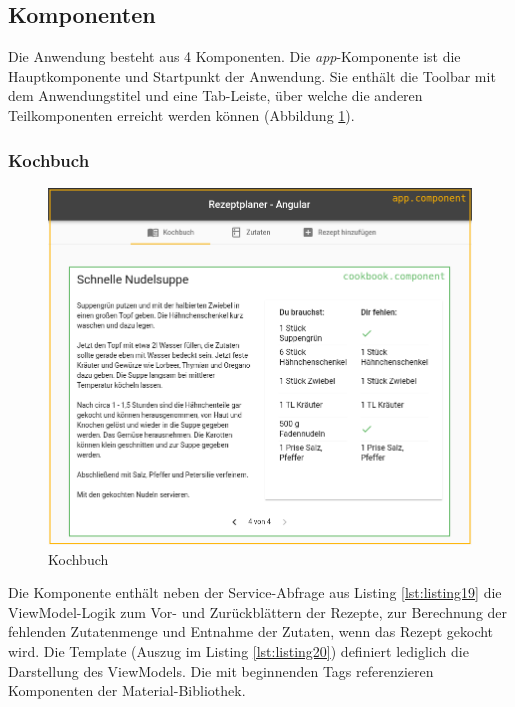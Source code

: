 \subsection{Komponenten}
Die Anwendung besteht aus 4 Komponenten. Die \textit{app}-Komponente ist die Hauptkomponente und Startpunkt der Anwendung. Sie enthält die Toolbar mit dem Anwendungstitel und eine Tab-Leiste, über welche die anderen Teilkomponenten erreicht werden können (Abbildung \ref{fig:kochbuch_angular}).

\subsubsection{Kochbuch}
\begin{figure}
  \centering
  \includegraphics[scale=0.6]{Grafiken/03_Implementation/Kochbuch_Angular_edited.png}
  \caption{Kochbuch}
  \label{fig:kochbuch_angular}
\end{figure}

Die Komponente enthält neben der Service-Abfrage aus Listing \ref{lst:listing19} die ViewModel-Logik zum Vor- und Zurückblättern der Rezepte, zur Berechnung der fehlenden Zutatenmenge und Entnahme der Zutaten, wenn das Rezept gekocht wird. Die Template (Auszug im Listing \ref{lst:listing20}) definiert lediglich die Darstellung des ViewModels. Die mit  beginnenden Tags referenzieren Komponenten der Material-Bibliothek. 

